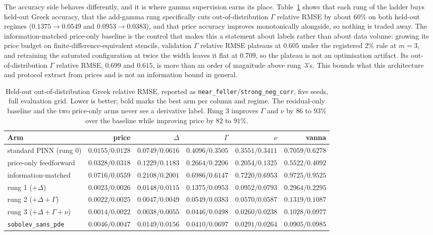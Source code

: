 \documentclass[10pt]{article}
\begin{document}
The accuracy side behaves differently, and it is where gamma supervision earns its
place. Table~\ref{tab:greeks} shows that each rung of the ladder buys held-out Greek
accuracy, that the add-gamma rung specifically cuts out-of-distribution $\Gamma$
relative RMSE by about $60\%$ on both held-out regimes ($0.1375\to0.0549$ and
$0.0953\to0.0383$), and that price accuracy improves monotonically alongside, so
nothing is traded away. The information-matched price-only baseline is the control
that makes this a statement about labels rather than about data volume: growing its
price budget on finite-difference-equivalent stencils, validation $\Gamma$ relative
RMSE plateaus at $0.605$ under the registered $2\%$ rule at $m=3$, and retraining
the saturated configuration at twice the width leaves it flat at $0.709$, so the
plateau is not an optimisation artifact. Its out-of-distribution $\Gamma$ relative
RMSE, $0.699$ and $0.615$, is more than an order of magnitude above rung~3's. This
bounds what this architecture and protocol extract from prices and is not an
information bound in general.

\begin{table}[!htbp]
\centering\footnotesize\setlength{\tabcolsep}{4pt}
\begin{tabular}{@{}lrrrrr@{}}
\toprule
Arm & price & $\Delta$ & $\Gamma$ & $\nu$ & vanna \\
\midrule
standard PINN (rung 0) & $0.0155/0.0128$ & $0.0749/0.0616$ & $0.4096/0.3505$ & $0.3551/0.3411$ & $0.7059/0.6278$ \\
price-only feedforward & $0.0328/0.0318$ & $0.1229/0.1183$ & $0.2664/0.2206$ & $0.2054/0.1325$ & $0.5522/0.4092$ \\
information-matched & $0.0716/0.0559$ & $0.2108/0.2001$ & $0.6986/0.6147$ & $0.7220/0.6953$ & $0.9725/0.9525$ \\
rung 1 ($+\Delta$) & $0.0023/0.0026$ & $0.0148/0.0115$ & $0.1375/0.0953$ & $0.0952/0.0793$ & $0.2964/0.2295$ \\
rung 2 ($+\Delta{+}\Gamma$) & $0.0022/0.0025$ & $0.0047/0.0049$ & $0.0549/0.0383$ & $0.0570/0.0587$ & $0.1319/0.1087$ \\
rung 3 ($+\Delta{+}\Gamma{+}\nu$) & $\mathbf{0.0014}/\mathbf{0.0022}$ & $\mathbf{0.0038}/0.0055$ & $0.0446/0.0498$ & $\mathbf{0.0260}/\mathbf{0.0238}$ & $0.1028/\mathbf{0.0977}$ \\
\texttt{sobolev\_sans\_pde} & $0.0046/0.0047$ & $0.0149/0.0156$ & $\mathbf{0.0410}/0.0697$ & $0.0291/0.0264$ & $0.0905/0.0985$ \\
\bottomrule
\end{tabular}
\caption{Held-out out-of-distribution Greek relative RMSE, reported as
\texttt{near\_feller}/\texttt{strong\_neg\_corr}, five seeds, full evaluation grid.
Lower is better; bold marks the best arm per column and regime. The residual-only
baseline and the two price-only arms never see a derivative label. Rung 3 improves
$\Gamma$ and $\nu$ by $86$ to $93\%$ over the baseline while improving price by
$82$ to $91\%$.}
\label{tab:greeks}
\end{table}
\end{document}
